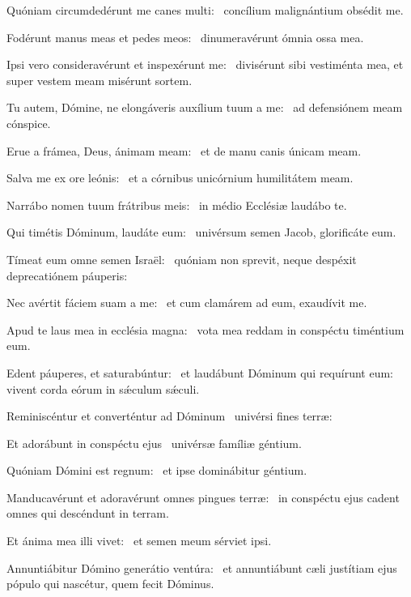 \item Quóniam circumdedérunt me canes multi:~\psstar{} concílium malignántium obsédit me.

\item Fodérunt manus meas et pedes meos:~\psstar{} dinumeravérunt ómnia ossa mea.

\item Ipsi vero consideravérunt et inspexérunt me:~\psstar{} divisérunt sibi vestiménta mea, et super vestem meam misérunt sortem.

\item Tu autem, Dómine, ne elongáveris auxílium tuum a me:~\psstar{} ad defensiónem meam cónspice.

\item Erue a frámea, Deus, ánimam meam:~\psstar{} et de manu canis únicam meam.

\item Salva me ex ore leónis:~\psstar{} et a córnibus unicórnium humilitátem meam.

\item Narrábo nomen tuum frátribus meis:~\psstar{} in médio Ecclésiæ laudábo te.

\item Qui timétis Dóminum, laudáte eum:~\psstar{} univérsum semen Jacob, glorificáte eum.

\item Tímeat eum omne semen Israël:~\psstar{} quóniam non sprevit, neque despéxit deprecatiónem páuperis:

\item Nec avértit fáciem suam a me:~\psstar{} et cum clamárem ad eum, exaudívit me.

\item Apud te laus mea in ecclésia magna:~\psstar{} vota mea reddam in conspéctu timéntium eum.

\item Edent páuperes, et saturabúntur:~\pscross{} et laudábunt Dóminum qui requírunt eum:~\psstar{} vivent corda eórum in sǽculum sǽculi.

\item Reminiscéntur et converténtur ad Dóminum~\psstar{} univérsi fines terræ:

\item Et adorábunt in conspéctu ejus~\psstar{} univérsæ famíliæ géntium.

\item Quóniam Dómini est regnum:~\psstar{} et ipse dominábitur géntium.

\item Manducavérunt et adoravérunt omnes pingues terræ:~\psstar{} in conspéctu ejus cadent omnes qui descéndunt in terram.

\item Et ánima mea illi vivet:~\psstar{} et semen meum sérviet ipsi.

\item Annuntiábitur Dómino generátio ventúra:~\psstar{} et annuntiábunt cæli justítiam ejus pópulo qui nascétur, quem fecit Dóminus.
